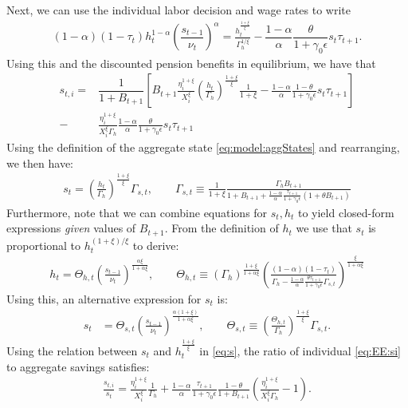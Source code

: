 Next, we can use the individual labor decision and wage rates to write 
\begin{align*}
    (1-\alpha)(1-\tau_t)h_t^{1-\alpha}\left(\dfrac{s_{t-1}}{\nu_t}\right)^{\alpha} = \frac{h_t^{\frac{1+\xi}{\xi}}}{\Gamma_{h}^{1/\xi}} - \dfrac{1-\alpha}{\alpha}\dfrac{\theta}{1+\gamma_0\epsilon} s_t\tau_{t+1}.
\end{align*}
Using this and the discounted pension benefits in equilibrium, we have that
\begin{align}
    s_{t,i} =& \dfrac{1}{1+B_{t+1}}\left[B_{t+1}\frac{\eta_{i}^{1+\xi}}{X_{i}^{\xi}}\left(\frac{h_t}{\Gamma_{h}}\right)^{\frac{1+\xi}{\xi}}\frac{1}{1+\xi}-\frac{1-\alpha}{\alpha}\frac{1-\theta}{1+\gamma_0\epsilon}s_t\tau_{t+1}\right] \nonumber \\
    -&\frac{\eta_{i}^{1+\xi}}{X_{i}^{\xi}\Gamma_{h}}\frac{1-\alpha}{\alpha}\frac{\theta}{1+\gamma_0\epsilon}s_t\tau_{t+1} \label{eq:EE:si}
\end{align}
Using the definition of the aggregate state \eqref{eq:model:aggStates} and rearranging, we then have:
\begin{align}\label{eq:s}
    s_t = \left(\frac{h_t}{\Gamma_{h}}\right)^{\frac{1+\xi}{\xi}} \Gamma_{s,t}, \qquad \Gamma_{s,t} \equiv \frac{1}{1+\xi}\frac{\Gamma_h B_{t+1} }{1+B_{t+1}+\frac{1-\alpha}{\alpha}\frac{\tau_{t+1}}{1+\gamma_0\epsilon}\left(1+\theta B_{t+1}\right)}
\end{align}
Furthermore, note that we can combine equations for $s_t, h_t$ to yield closed-form expressions \textit{given} values of $B_{t+1}$. From the definition of $h_t$ we use that $s_t$ is proportional to $h_t^{(1+\xi)/\xi}$ to derive:
\begin{align}\label{eq:h}
    h_t = \Theta_{h,t} \left(\frac{s_{t-1}}{\nu_t}\right)^{\frac{\alpha\xi}{1+\alpha\xi}}, \qquad \Theta_{h,t} \equiv \left(\Gamma_{h}\right)^{\frac{1+\xi}{1+\alpha\xi}}\left(\frac{(1-\alpha)(1-\tau_t)}{\Gamma_{h}-\frac{1-\alpha}{\alpha}\frac{\theta\tau_{t+1}}{1+\gamma_0\epsilon}\Gamma_{s,t}}\right)^{\frac{\xi}{1+\alpha\xi}}
\end{align}
Using this, an alternative expression for $s_t$ is:
\begin{align}
    s_t &= \Theta_{s,t}\left(\frac{s_{t-1}}{\nu_t}\right)^{\frac{\alpha(1+\xi)}{1+\alpha\xi}}, \qquad \Theta_{s,t} \equiv \left(\frac{\Theta_{h,t}}{\Gamma_{h}}\right)^{\frac{1+\xi}{\xi}}\Gamma_{s,t}. 
\end{align}
Using the relation between $s_t$ and $h_t^{\frac{1+\xi}{\xi}}$ in \eqref{eq:s}, the ratio of individual \eqref{eq:EE:si} to aggregate savings satisfies:
\begin{align}\label{eq:si_s}
    \frac{s_{t,i}}{s_t} = \frac{\eta_i^{1+\xi}}{X_i^{\xi}} \frac{1}{\Gamma_h} + \frac{1-\alpha}{\alpha} \frac{\tau_{t+1}}{1+\gamma_0\epsilon}\frac{1-\theta}{1+B_{t+1}}\left(\frac{\eta_i^{1+\xi}}{X_i^{\xi}\Gamma_h}-1\right).
\end{align}


